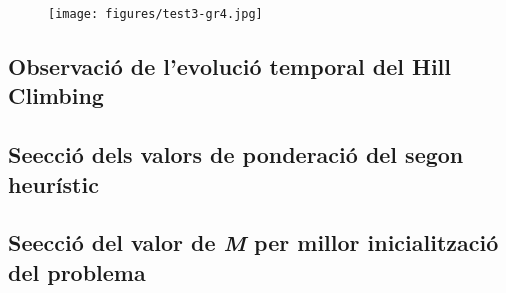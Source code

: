\begin{figure}[H]
\begin{center}
 \texttt{[image: figures/test3-gr4.jpg]}
 \label{test3-gr4}
\end{center}
\end{figure}


\subsection{Observació de l'evolució temporal del Hill Climbing}

\subsection{Se\lgem ecció dels valors de ponderació del segon heurístic}

\subsection{Se\lgem ecció del valor de \emph{M} per millor inicialització del problema}